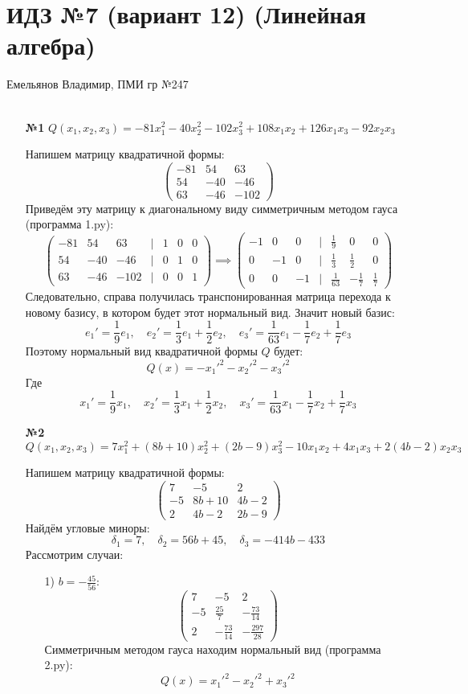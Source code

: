 \documentclass[a4paper]{article}
\newcommand{\mat}[1]{\begin{pmatrix} #1 \end{pmatrix}}
\renewcommand{\f}[2]{\frac{#1}{#2}}
\begin{document}
\section*{ИДЗ №7 (вариант 12) (Линейная алгебра)}
 {\large Емельянов Владимир, ПМИ гр №247}\\\\
\begin{enumerate}
    \item[\textbf{№1}]$Q(x_1, x_2, x_3) = -81x_1^2 - 40x_2^2 - 102x_3^2 + 108x_1x_2 + 126x_1x_3 - 92x_2x_3$
    
    Напишем матрицу квадратичной формы:
    $$\mat{
        -81 & 54 & 63\\
        54 & -40 & -46 \\
        63 & -46 & -102    
    }$$
    Приведём эту матрицу к диагональному виду симметричным методом гауса (программа 1.py):
    $$
    \mat{
        -81 & 54 & 63 & | & 1 & 0 & 0\\
        54 & -40 & -46 & | & 0 & 1 & 0\\
        63 & -46 & -102 & | & 0 & 0 & 1   
    } \implies
    \begin{pmatrix}
        -1 & 0 & 0 & | & \frac{1}{9} & 0 & 0 \\
        0 & -1 & 0 & | & \frac{1}{3} & \frac{1}{2} & 0 \\
        0 & 0 & -1 & | & \frac{1}{63} & -\frac{1}{7} & \frac{1}{7}
        \end{pmatrix}
    $$
    Следовательно, справа  получилась транспонированная матрица перехода к новому базису, в котором будет этот нормальный вид. 
    Значит новый базис:
    $$e_1' = \f{1}{9}e_1, \quad e_2' = \f{1}{3}e_1 + \f{1}{2}e_2, \quad e_3' = \f{1}{63}e_1-\f{1}{7}e_2+\f{1}{7}e_3$$
    Поэтому нормальный вид квадратичной формы $Q$ будет:
    $$Q(x) = -x_1'^2-x_2'^2-x_3'^2$$
    Где
    $$x_1' = \f{1}{9}x_1, \quad x_2' = \f{1}{3}x_1 + \f{1}{2}x_2, \quad x_3' = \f{1}{63}x_1-\f{1}{7}x_2+\f{1}{7}x_3$$

    \item[\textbf{№2}]\small{\( Q(x_1, x_2, x_3) = 7x_1^2 + (8b + 10)x_2^2 + (2b - 9)x_3^2 - 10x_1x_2 + 4x_1x_3 + 2(4b - 2)x_2x_3 \)}
    
    Напишем матрицу квадратичной формы:
    $$\mat{
        7 & -5 & 2\\
        -5 & 8b+10 & 4b-2 \\
        2 & 4b-2 & 2b-9    
    }$$
    Найдём угловые миноры:
    $$\delta_1 = 7, \quad \delta_2 = 56b+45, \quad \delta_3 = -414b - 433$$
    Рассмотрим случаи:
    \begin{enumerate}
        \item[1)]$b = -\f{45}{56}$:
        $$\begin{pmatrix}
            7 & -5 & 2 \\
            -5 & \frac{25}{7} & -\frac{73}{14} \\
            2 & -\frac{73}{14} & -\frac{297}{28}
            \end{pmatrix}$$
        Симметричным методом гауса находим нормальный вид (программа 2.py):
        $$Q(x) = x_1'^2-x_2'^2+x_3'^2$$


\end{enumerate}
\end{enumerate}
\end{document}
